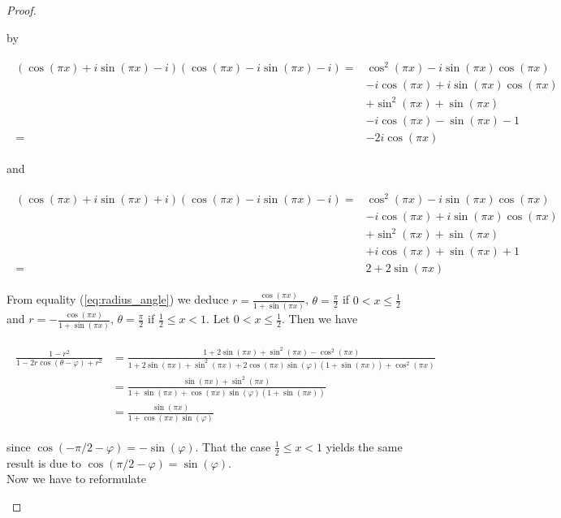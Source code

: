 \begin{proof}
\begin{enumerate}[label = \textbf{(\roman*.)}]
	by

	\begin{gather*}
		\begin{aligned}
			\left(\cos(\pi x) + i\sin(\pi x) - i\right)\left(\cos(\pi x) - i\sin(\pi x) - i\right) =& \cos^2(\pi x) - i\sin(\pi x)\cos(\pi x)\\	
			& -i\cos(\pi x) + i\sin(\pi x)\cos(\pi x)\\
			& + \sin^2(\pi x) + \sin(\pi x)\\
			& -i \cos(\pi x) - \sin(\pi x) -1\\
			=& -2i \cos(\pi x)  
		\end{aligned}
	\end{gather*}

	and

	\begin{gather*}
		\begin{aligned}
			\left( \cos(\pi x) + i\sin(\pi x) + i \right)\left( \cos(\pi x) - i\sin(\pi x) - i \right) =& \cos^2(\pi x) - i\sin(\pi x)\cos(\pi x)\\
			& -i\cos(\pi x) + i\sin(\pi x)\cos(\pi x)\\
			& + \sin^2(\pi x) + \sin(\pi x)\\
			& + i \cos(\pi x) + \sin(\pi x) + 1\\
			=& 2 + 2\sin(\pi x)
		\end{aligned}
	\end{gather*}

	From equality (\ref{eq:radius_angle}) we deduce $r = \frac{\cos(\pi x)}{1 + \sin(\pi x)}$, $\theta = \frac{\pi}{2}$ if $0 < x \leqslant \frac{1}{2}$ and $r = -\frac{\cos(\pi x)}{1 + \sin(\pi x)}$, $\theta = \frac{\pi}{2}$ if $\frac{1}{2} \leqslant x < 1$. Let $0 < x \leqslant \frac{1}{2}$. Then we have

	\begin{gather*}
		\begin{aligned}
			\frac{1 - r^2}{1 - 2r\cos(\theta - \varphi) + r^2} &= \frac{1 + 2\sin(\pi x) + \sin^2(\pi x) - \cos^2(\pi x)}{1 + 2\sin(\pi x) + \sin^2(\pi x) + 2\cos(\pi x)\sin(\varphi)(1 + \sin(\pi x)) + \cos^2(\pi x)}\\
			&= \frac{\sin(\pi x) + \sin^2(\pi x)}{1 + \sin(\pi x) + \cos(\pi x)\sin(\varphi)(1 + \sin(\pi x))}\\
			&= \frac{\sin(\pi x)}{1 + \cos(\pi x)\sin(\varphi)}
		\end{aligned}
	\end{gather*}

	since $\cos\left( -\pi/2 - \varphi \right) = -\sin(\varphi)$. That the case $\frac{1}{2} \leqslant x < 1$ yields the same result is due to $\cos(\pi/2 - \varphi) = \sin(\varphi)$.\\
	Now we have to reformulate 


\end{enumerate}
\end{proof}
